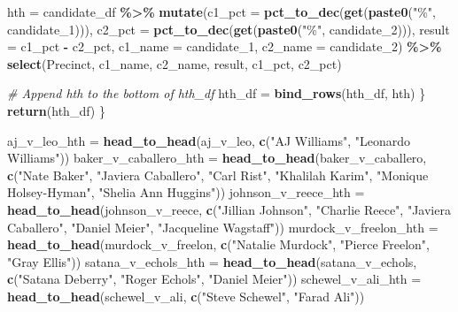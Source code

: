 \documentclass[
]{article}
\newenvironment{Shaded}{\begin{snugshade}}{\end{snugshade}}
\newcommand{\AttributeTok}[1]{\textcolor[rgb]{0.13,0.29,0.53}{#1}}
\newcommand{\CommentTok}[1]{\textcolor[rgb]{0.56,0.35,0.01}{\textit{#1}}}
\newcommand{\FunctionTok}[1]{\textcolor[rgb]{0.13,0.29,0.53}{\textbf{#1}}}
\newcommand{\NormalTok}[1]{#1}
\newcommand{\OtherTok}[1]{\textcolor[rgb]{0.56,0.35,0.01}{#1}}
\newcommand{\SpecialCharTok}[1]{\textcolor[rgb]{0.81,0.36,0.00}{\textbf{#1}}}
\newcommand{\StringTok}[1]{\textcolor[rgb]{0.31,0.60,0.02}{#1}}
\begin{document}
\begin{Shaded}
\begin{Highlighting}[]
\NormalTok{    hth }\OtherTok{=}\NormalTok{ candidate\_df }\SpecialCharTok{\%\textgreater{}\%}
      \FunctionTok{mutate}\NormalTok{(}\AttributeTok{c1\_pct =} \FunctionTok{pct\_to\_dec}\NormalTok{(}\FunctionTok{get}\NormalTok{(}\FunctionTok{paste0}\NormalTok{(}\StringTok{"\%"}\NormalTok{, candidate\_1))),}
             \AttributeTok{c2\_pct =} \FunctionTok{pct\_to\_dec}\NormalTok{(}\FunctionTok{get}\NormalTok{(}\FunctionTok{paste0}\NormalTok{(}\StringTok{"\%"}\NormalTok{, candidate\_2))),}
             \AttributeTok{result =}\NormalTok{ c1\_pct }\SpecialCharTok{{-}}\NormalTok{ c2\_pct,}
             \AttributeTok{c1\_name =}\NormalTok{ candidate\_1,}
             \AttributeTok{c2\_name =}\NormalTok{ candidate\_2) }\SpecialCharTok{\%\textgreater{}\%}
      \FunctionTok{select}\NormalTok{(Precinct, c1\_name, c2\_name, result, c1\_pct, c2\_pct)}
    
    \CommentTok{\# Append hth to the bottom of hth\_df}
\NormalTok{    hth\_df }\OtherTok{=} \FunctionTok{bind\_rows}\NormalTok{(hth\_df, hth)}
\NormalTok{  \}}
  \FunctionTok{return}\NormalTok{(hth\_df)}
\NormalTok{\}}
\end{Highlighting}
\end{Shaded}

\begin{Shaded}
\begin{Highlighting}[]
\NormalTok{aj\_v\_leo\_hth }\OtherTok{=} \FunctionTok{head\_to\_head}\NormalTok{(aj\_v\_leo, }\FunctionTok{c}\NormalTok{(}\StringTok{"AJ Williams"}\NormalTok{, }\StringTok{"Leonardo Williams"}\NormalTok{))}
\NormalTok{baker\_v\_caballero\_hth }\OtherTok{=} \FunctionTok{head\_to\_head}\NormalTok{(baker\_v\_caballero, }\FunctionTok{c}\NormalTok{(}\StringTok{"Nate Baker"}\NormalTok{, }\StringTok{"Javiera Caballero"}\NormalTok{, }\StringTok{"Carl Rist"}\NormalTok{, }\StringTok{"Khalilah Karim"}\NormalTok{, }\StringTok{"Monique Holsey{-}Hyman"}\NormalTok{, }\StringTok{"Shelia Ann Huggins"}\NormalTok{))}
\NormalTok{johnson\_v\_reece\_hth }\OtherTok{=} \FunctionTok{head\_to\_head}\NormalTok{(johnson\_v\_reece, }\FunctionTok{c}\NormalTok{(}\StringTok{"Jillian Johnson"}\NormalTok{, }\StringTok{"Charlie Reece"}\NormalTok{, }\StringTok{"Javiera Caballero"}\NormalTok{, }\StringTok{"Daniel Meier"}\NormalTok{, }\StringTok{"Jacqueline Wagstaff"}\NormalTok{))}
\NormalTok{murdock\_v\_freelon\_hth }\OtherTok{=} \FunctionTok{head\_to\_head}\NormalTok{(murdock\_v\_freelon, }\FunctionTok{c}\NormalTok{(}\StringTok{"Natalie Murdock"}\NormalTok{, }\StringTok{"Pierce Freelon"}\NormalTok{, }\StringTok{"Gray Ellis"}\NormalTok{))}
\NormalTok{satana\_v\_echols\_hth }\OtherTok{=} \FunctionTok{head\_to\_head}\NormalTok{(satana\_v\_echols, }\FunctionTok{c}\NormalTok{(}\StringTok{"Satana Deberry"}\NormalTok{, }\StringTok{"Roger Echols"}\NormalTok{, }\StringTok{"Daniel Meier"}\NormalTok{))}
\NormalTok{schewel\_v\_ali\_hth }\OtherTok{=} \FunctionTok{head\_to\_head}\NormalTok{(schewel\_v\_ali, }\FunctionTok{c}\NormalTok{(}\StringTok{"Steve Schewel"}\NormalTok{, }\StringTok{"Farad Ali"}\NormalTok{))}
\end{Highlighting}
\end{Shaded}
\end{document}
